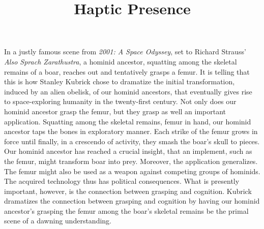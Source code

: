 \documentclass[12pt]{article}
\title{Haptic Presence}
\author{\myauthor}
\date{} %
\begin{document}
\maketitle

\setlength{\parindent}{1em}


In a justly famous scene from \emph{2001: A Space Odyssey}, set to Richard Strauss' \emph{Also Sprach Zarathustra}, a hominid ancestor, squatting among the skeletal remains of a boar, reaches out and tentatively grasps a femur. It is telling that this is how Stanley Kubrick chose to dramatize the initial transformation, induced by an alien obelisk, of our hominid ancestors, that eventually gives rise to space-exploring humanity in the twenty-first century. Not only does our hominid ancestor grasp the femur, but they grasp as well an important application. Squatting among the skeletal remains, femur in hand, our hominid ancestor taps the bones in exploratory manner. Each strike of the femur grows in force until finally, in a crescendo of activity, they smash the boar's skull to pieces. Our hominid ancestor has reached a crucial insight, that an implement, such as the femur, might transform boar into prey. Moreover, the application generalizes. The femur might also be used as a weapon against competing groups of hominids. The acquired technology thus has political consequences. What is presently important, however, is the connection between grasping and cognition. Kubrick dramatizes the connection between grasping and cognition by having our hominid ancestor's grasping the femur among the boar's skeletal remains be the primal scene of a dawning understanding.
\end{document}
